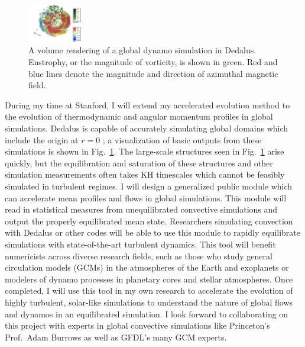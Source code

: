 \documentclass[aps, pre, onecolumn, nofootinbib, notitlepage, groupedaddress, amsfonts, amssymb, amsmath]{revtex4-1}
\begin{document}
\begin{figure}
	\begin{center}
	\vspace{-10pt}
    \includegraphics[width=0.21\textwidth]{./figs/mdwarf.png}
	\vspace{-16pt}
	\end{center}
    \caption{A volume rendering of a global dynamo simulation in Dedalus.
	Enstrophy, or the magnitude of vorticity, is shown in green.
	Red and blue lines denote the magnitude and direction of azimuthal magnetic field.
	\label{fig:mdwarf} }
\end{figure}
During my time at Stanford, I will extend my accelerated evolution method \citep{anders&all2018} to the evolution of thermodynamic and angular momentum profiles in global simulations.
Dedalus is capable of accurately simulating global domains which include the origin at $r = 0$ \citep{lecoanet&all2019}; a visualization of basic outputs from these simulations is shown in Fig.~\ref{fig:mdwarf}.
The large-scale structures seen in Fig.~\ref{fig:mdwarf} arise quickly, but the equilibration and saturation of these structures and other simulation measurements often takes KH timescales which cannot be feasibly simulated in turbulent regimes.
I will design a generalized public module which can accelerate mean profiles and flows in global simulations.
This module will read in statistical measures from unequilibrated convective simulations and output the properly equilibrated mean state.
Researchers simulating convection with Dedalus or other codes will be able to use this module to rapidly equilibrate simulations with state-of-the-art turbulent dynamics.
This tool will benefit numericists across diverse research fields, such as those who study general circulation models (GCMs) in the atmospheres of the Earth and exoplanets or modelers of dynamo processes in planetary cores and stellar atmospheres.
Once completed, I will use this tool in my own research to accelerate the evolution of highly turbulent, solar-like simulations to understand the nature of global flows and dynamos in an equilibrated simulation.
I look forward to collaborating on this project with experts in global convective simulations like Princeton's Prof.~Adam Burrows as well as GFDL's many GCM experts.
\end{document}
